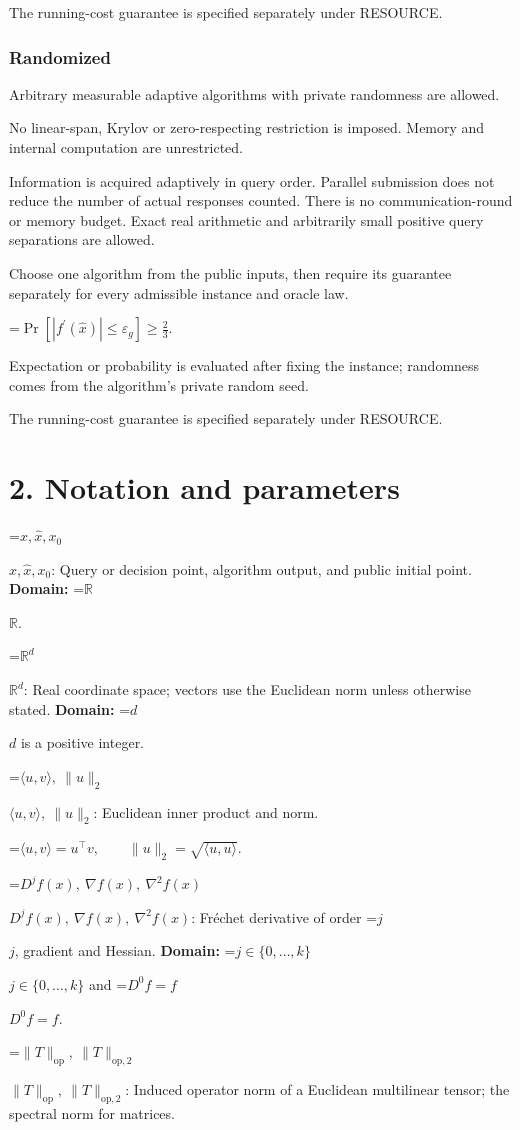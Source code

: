 \documentclass[10pt,a4paper]{article}
\newcommand{\AtlasMath}[1]{\par\begingroup\centering\setbox0=\hbox{$\displaystyle #1$}\ifdim\wd0>1.4\linewidth\typeout{ATLAS WIDE FORMULA: \the\wd0}\fi\ifdim\wd0>\linewidth\resizebox{\linewidth}{!}{\box0}\else\box0\fi\par\endgroup}
\newcommand{\AtlasInlineMath}[1]{\begingroup\setbox0=\hbox{$#1$}\ifdim\wd0>.4\linewidth\endgroup\AtlasMath{#1}\else\endgroup$#1$\fi}
\begin{document}
The running-cost guarantee is specified separately under RESOURCE.

\subsubsection{Randomized}
Arbitrary measurable adaptive algorithms with private randomness are allowed.

No linear-span, Krylov or zero-respecting restriction is imposed. Memory and internal computation are unrestricted.

Information is acquired adaptively in query order. Parallel submission does not reduce the number of actual responses counted. There is no communication-round or memory budget. Exact real arithmetic and arbitrarily small positive query separations are allowed.

Choose one algorithm from the public inputs, then require its guarantee separately for every admissible instance and oracle law.


\AtlasMath{\Pr\!\left[|f^{\prime}(\widehat{x})|\le \varepsilon_g\right]\ge\frac23.}


Expectation or probability is evaluated after fixing the instance; randomness comes from the algorithm's private random seed.

The running-cost guarantee is specified separately under RESOURCE.

\section{2. Notation and parameters}
\AtlasInlineMath{x,\widehat{x},x_0}: Query or decision point, algorithm output, and public initial point. \textbf{Domain:} \AtlasInlineMath{\mathbb{R}}.

\AtlasInlineMath{\mathbb{R}^d}: Real coordinate space; vectors use the Euclidean norm unless otherwise stated. \textbf{Domain:} \AtlasInlineMath{d} is a positive integer.

\AtlasInlineMath{\langle u,v\rangle,\ \|u\|_2}: Euclidean inner product and norm.


\AtlasMath{\langle u,v\rangle=u^\top v,\qquad\|u\|_2=\sqrt{\langle u,u\rangle}.}


\AtlasInlineMath{D^jf(x),\ \nabla f(x),\ \nabla^2f(x)}: Fréchet derivative of order \AtlasInlineMath{j}, gradient and Hessian. \textbf{Domain:} \AtlasInlineMath{j\in\{0,\ldots,k\}} and \AtlasInlineMath{D^0f=f}.

\AtlasInlineMath{\|T\|_{\mathrm{op}},\ \|T\|_{\mathrm{op},2}}: Induced operator norm of a Euclidean multilinear tensor; the spectral norm for matrices.
\end{document}
